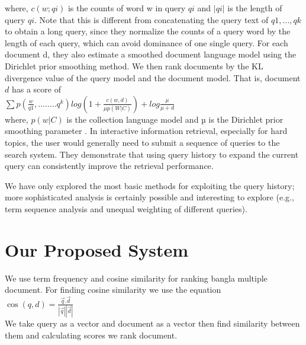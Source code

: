where, $c(w; qi)$ is the counts of word w in query $qi$ and $|qi|$ is the length of query $qi$. Note that this is different from concatenating the query text of $q1, ..., qk$ to obtain a long query, since they normalize the counts of a query word by the length of each query, which can avoid dominance of one single query. For each document d, they also estimate a smoothed document language model using the Dirichlet prior smoothing method. We then rank documents by the KL divergence value of the query model and the document model. That is, document $d$ has a score of\\

\(\sum{p(\frac{w}{q1},........q^k)log(1+\frac{c(w,d)}{\mu p(W|C)})}+log\frac{\mu}{\mu +d}\)\\

where, $p(w|C)$ is the collection language model and $µ$ is the Dirichlet prior smoothing parameter . In interactive information retrieval, especially for hard topics, the user would generally need to submit a sequence of queries to the search system. They demonstrate that using query history to expand the current query can consistently improve the retrieval performance. 

We have only explored the most basic methods for exploiting the query history; more sophisticated analysis is certainly possible and interesting to explore (e.g., term sequence analysis and unequal weighting of different queries).


\section{Our Proposed System}

We use term frequency and cosine similarity for ranking bangla multiple document. For finding cosine similarity we use the equation\\

\(\cos(q,d) = \frac{\overrightarrow{q}.\overrightarrow{d}}{|\overrightarrow{q}||\overrightarrow{d}|}\)\\

We take query as a vector and document as a vector then find similarity between them and calculating scores we rank document.







